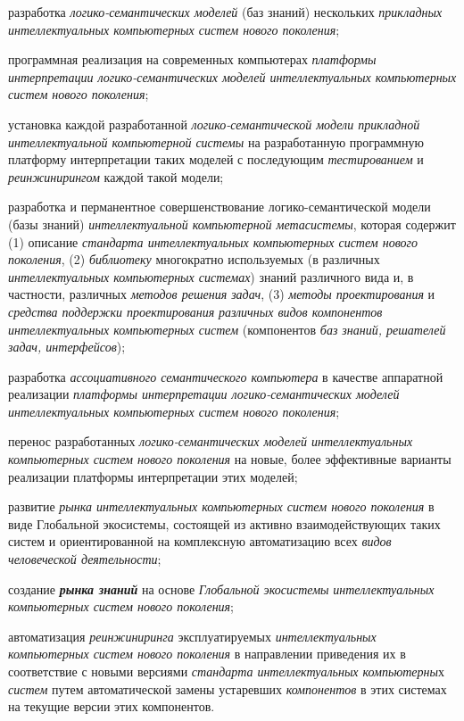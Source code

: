 \begin{textitemize}
	\begin{textitemize}
		\item
		разработка \textit{логико-семантических моделей} (баз знаний) нескольких \textit{прикладных интеллектуальных компьютерных систем нового поколения};
		\item
		программная реализация на современных компьютерах \textit{платформы интерпретации логико-семантических моделей интеллектуальных компьютерных систем нового поколения};
		\item
		установка каждой разработанной \textit{логико-семантической модели прикладной интеллектуальной компьютерной системы} на разработанную программную платформу интерпретации таких моделей с последующим \textit{тестированием} и \textit{реинжинирингом} каждой такой модели;
		\item
		разработка и перманентное совершенствование логико-семантической модели (базы знаний) \textit{интеллектуальной компьютерной метасистемы}, которая содержит (1) описание \textit{стандарта интеллектуальных компьютерных систем нового поколения}, (2) \textit{библиотеку} многократно используемых (в различных \textit{интеллектуальных компьютерных системах}) знаний различного вида и, в частности, различных \textit{методов решения задач}, (3) \textit{методы проектирования} и \textit{средства поддержки проектирования} \textit{различных видов компонентов интеллектуальных компьютерных систем} (компонентов \textit{баз знаний, решателей задач, интерфейсов});
		\item
		разработка \textit{ассоциативного семантического компьютера} в качестве аппаратной реализации \textit{платформы интерпретации логико-семантических моделей интеллектуальных компьютерных систем нового поколения};
		\item
		перенос разработанных \textit{логико-семантических моделей интеллектуальных компьютерных систем нового поколения} на новые, более эффективные варианты реализации платформы интерпретации этих моделей;
		\item
		развитие \textit{рынка интеллектуальных компьютерных систем нового поколения} в виде Глобальной экосистемы, состоящей из активно взаимодействующих таких систем и ориентированной на комплексную автоматизацию всех \textit{видов} \textit{человеческой деятельности};
		\item
		создание \textbf{\textit{рынка знаний}} на основе \textit{Глобальной экосистемы} \textit{интеллектуальных компьютерных систем нового поколения};
		\item
		автоматизация \textit{реинжиниринга} эксплуатируемых \textit{интеллектуальных компьютерных систем нового поколения} в направлении приведения их в соответствие с новыми версиями \textit{стандарта интеллектуальных компьютерны}х \textit{систем} путем автоматической замены устаревших \textit{компонентов} в этих системах на текущие версии этих компонентов.
	\end{textitemize}
\end{textitemize}

